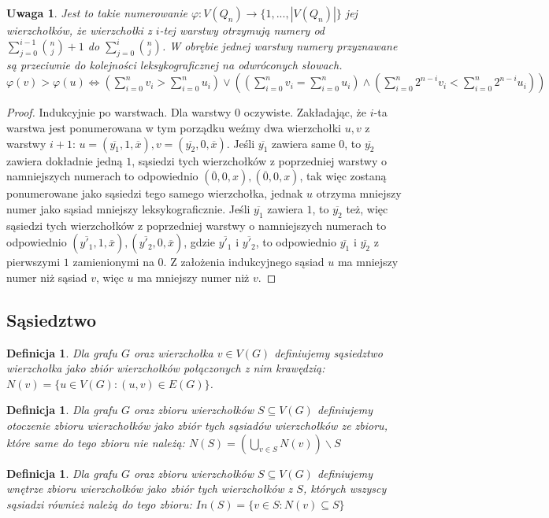 \documentclass{pracamgr}
\newtheorem{defi}[theorem]{Definicja} %
\newtheorem{remark}[theorem]{Uwaga}
\begin{document}
    \begin{remark}\label{numerowanie warstwowe 2}
     Jest to takie numerowanie $\varphi:V(Q_n)\rightarrow\{1,...,|V(Q_n)|\}$ jej wierzchołków,
     że wierzchołki z $i$-tej warstwy otrzymują numery od $\sum_{j=0}^{i-1}{n\choose j}+1$ do $\sum_{j=0}^{i}{n\choose j}$.
     W obrębie jednej warstwy numery przyznawane są przeciwnie do kolejności leksykograficznej na odwróconych słowach.
     $\varphi(v)>\varphi(u)\Leftrightarrow (\sum_{i=0}^n v_i>\sum_{i=0}^n u_i)
     \vee((\sum_{i=0}^n v_i=\sum_{i=0}^n u_i)\wedge(\sum_{i=0}^n2^{n-i}v_i<\sum_{i=0}^n2^{n-i}u_i))$
    \end{remark}
    \begin{proof}
     Indukcyjnie po warstwach.\newline
     Dla warstwy $0$ oczywiste.\newline
     Zakładając, że $i$-ta warstwa jest ponumerowana w tym porządku weźmy dwa wierzchołki $u,v$ z warstwy $i+1$:
     $u=(\overline{y_1},1,\overline{x}),v=(\overline{y_2},0,\overline{x})$.\newline
     Jeśli $\overline{y_1}$ zawiera same $0$, to $\overline{y_2}$ zawiera dokładnie jedną $1$, sąsiedzi tych wierzchołków z poprzedniej warstwy
     o namniejszych numerach to odpowiednio $(\overline{0},0,x),(\overline{0},0,x)$,
     tak więc zostaną ponumerowane jako sąsiedzi tego samego wierzchołka, jednak $u$ otrzyma mniejszy numer jako sąsiad mniejszy leksykograficznie.\newline
     Jeśli $\overline{y_1}$ zawiera $1$, to $\overline{y_2}$ też, więc sąsiedzi tych wierzchołków z poprzedniej warstwy
     o namniejszych numerach to odpowiednio $(\overline{y'_1},1,\overline{x}),(\overline{y'_2},0,\overline{x})$, gdzie $\overline{y'_1}$ i $\overline{y'_2}$,
     to odpowiednio $\overline{y_1}$ i $\overline{y_2}$ z pierwszymi $1$ zamienionymi na $0$. Z założenia indukcyjnego sąsiad $u$ ma mniejszy numer niż sąsiad $v$,
     więc $u$ ma mniejszy numer niż $v$.
    \end{proof}
   \subsection{Sąsiedztwo}
    \begin{defi}\label{sasiedztwo wierzcholka}
     Dla grafu $G$ oraz wierzchołka $v\in V(G)$ definiujemy \emph{sąsiedztwo wierzchołka} jako zbiór wierzchołków połączonych z nim krawędzią:
     $N(v)=\{u\in V(G):(u,v)\in E(G)\}$.
    \end{defi}
    \begin{defi}\label{otoczenie zbioru wierzcholkow}
     Dla grafu $G$ oraz zbioru wierzchołków $S\subseteq V(G)$ definiujemy \emph{otoczenie zbioru wierzchołków} jako zbiór tych sąsiadów wierzchołków ze zbioru,
     które same do tego zbioru nie należą: $N(S)=(\bigcup_{v\in S}N(v))\backslash S$
    \end{defi}
    \begin{defi}\label{wnetrze zbioru wierzcholkow}
     Dla grafu $G$ oraz zbioru wierzchołków $S\subseteq V(G)$ definiujemy \emph{wnętrze zbioru wierzchołków} jako zbiór tych wierzchołków z $S$,
     których wszyscy sąsiadzi również należą do tego zbioru: $In(S)=\{v\in S:N(v)\subseteq S\}$
    \end{defi}
\end{document}
